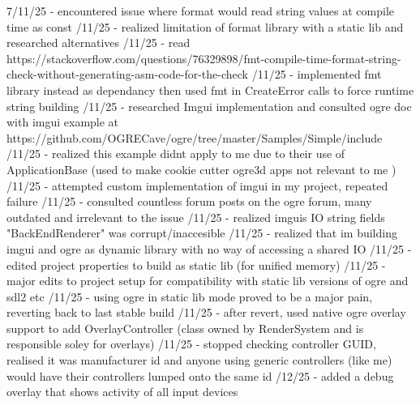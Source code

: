 \documentclass[]{final_report}
\begin{document}
7/11/25 - encountered issue where format would read string values at compile time as const /11/25 - realized limitation of format library with a static lib and researched alternatives /11/25 - read https://stackoverflow.com/questions/76329898/fmt-compile-time-format-string-check-without-generating-asm-code-for-the-check /11/25 - implemented fmt library instead as dependancy then used fmt in CreateError calls to force runtime string building /11/25 - researched Imgui implementation and consulted ogre doc with imgui example at https://github.com/OGRECave/ogre/tree/master/Samples/Simple/include /11/25 - realized this example didnt apply to me due to their use of ApplicationBase (used to make cookie cutter ogre3d apps not relevant to me ) /11/25 - attempted custom implementation of imgui in my project, repeated failure /11/25 - consulted countless forum posts on the ogre forum, many outdated and irrelevant to the issue /11/25 - realized imguis IO string fields "BackEndRenderer" was corrupt/inaccesible /11/25 - realized that im building imgui and ogre as dynamic library with no way of accessing a shared IO /11/25 - edited project properties to build as static lib (for unified memory) /11/25 - major edits to project setup for compatibility with static lib versions of ogre and sdl2 etc /11/25 - using ogre in static lib mode proved to be a major pain, reverting back to last stable build /11/25 - after revert, used native ogre overlay support to add OverlayController (class owned by RenderSystem and is responsible soley for overlays) /11/25 - stopped checking controller GUID, realised it was manufacturer id and anyone using generic controllers (like me) would have their controllers lumped onto the same id /12/25 - added a debug overlay that shows activity of all input devices \newline
\end{document}
